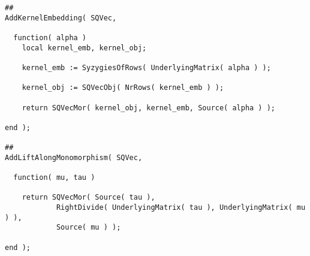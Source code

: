 \begin{small}
\begin{Verbatim}[frame=single]
##
AddKernelEmbedding( SQVec,

  function( alpha )
    local kernel_emb, kernel_obj;
    
    kernel_emb := SyzygiesOfRows( UnderlyingMatrix( alpha ) );
    
    kernel_obj := SQVecObj( NrRows( kernel_emb ) );
    
    return SQVecMor( kernel_obj, kernel_emb, Source( alpha ) );
    
end );

##
AddLiftAlongMonomorphism( SQVec,

  function( mu, tau )

    return SQVecMor( Source( tau ),
            RightDivide( UnderlyingMatrix( tau ), UnderlyingMatrix( mu ) ),
            Source( mu ) );

end );
\end{Verbatim}
\end{small}